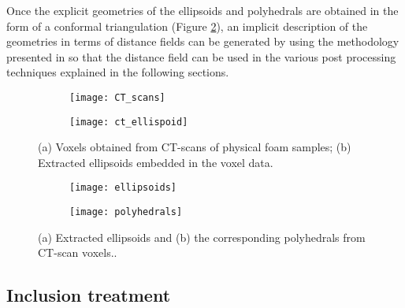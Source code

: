 Once the explicit geometries of the ellipsoids and polyhedrals are obtained in the form of a conformal triangulation (Figure \ref{fig-of-polyhedra}), an implicit description of the geometries in terms of distance fields can be generated by using the methodology presented in \cite{ehabmoustafakamelIntegratedApproachConformal2019} so that the distance field can be used in the various post processing techniques explained in the following sections.

\begin{figure}
	\centering
	\begin{subfigure}{0.45\textwidth}
		\texttt{[image: CT\_scans]}
		\caption{}
	\end{subfigure}
	\begin{subfigure}{0.45\textwidth}
	\texttt{[image: ct\_ellispoid]}
		\caption{}
	\end{subfigure}
	\caption{(a) Voxels obtained from CT-scans of physical foam samples\cite{jungMicrostructuralCharacterisationExperimental2017}; (b) Extracted ellipsoids embedded in the voxel data\cite{leblancAnalysisOpenFoamUnderPreparation}.}\label{fig-of-ellipsoids}
\end{figure}

\begin{figure}
	\centering
	\begin{subfigure}{0.45\textwidth}
		\texttt{[image: ellipsoids]}
		\caption{}
	\end{subfigure}
	\begin{subfigure}{0.45\textwidth}
		\texttt{[image: polyhedrals]}
		\caption{}
	\end{subfigure}
	\caption{(a) Extracted ellipsoids and (b) the corresponding polyhedrals from CT-scan voxels.\cite{leblancAnalysisOpenFoamUnderPreparation}.}\label{fig-of-polyhedra}
\end{figure}

\subsection{Inclusion treatment}\label{of-CT-incl}

